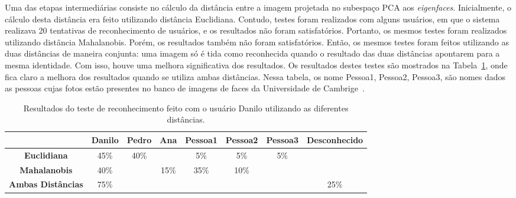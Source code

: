 

		Uma das etapas intermediárias consiste no cálculo da distância entre a imagem projetada no subespaço PCA aos \textit{eigenfaces}. Inicialmente, o cálculo desta distância era feito utilizando distância Euclidiana. Contudo, testes foram realizados com alguns usuários, em que o sistema realizava 20 tentativas de reconhecimento de usuários, e os resultados não foram satisfatórios. Portanto, os mesmos testes foram realizados utilizando distância Mahalanobis. Porém, os resultados também não foram satisfatórios. Então, os mesmos testes foram feitos utilizando as duas distâncias de maneira conjunta: uma imagem só é tida como reconhecida quando o resultado das duas distâncias apontarem para a mesma identidade. Com isso, houve uma melhora significativa dos resultados. Os resultados destes testes são mostrados na Tabela~\ref{tab:distancias}, onde fica claro a melhora dos resultados quando se utiliza ambas distâncias. Nessa tabela, os nome Pessoa1, Pessoa2, Pessoa3, são nomes dados as pessoas cujas fotos estão presentes no banco de imagens de faces da Universidade de Cambrige~\cite{cambridgeFaceDb}.

		\begin{table}[H]
		\begin{center}
			\caption{Resultados do teste de reconhecimento feito com o usuário Danilo utilizando as diferentes distâncias.}
			\label{tab:distancias}
			\begin{tabular}{|c|c|c|c|c|c|c|c|}
				\hline & \bf Danilo & \bf Pedro & \bf Ana & \bf Pessoa1 & \bf Pessoa2 & \bf Pessoa3 & \bf Desconhecido\\
				\hline \bf Euclidiana & 45\% & 40\% & & 5\% & 5\% & 5\% &\\
				\hline \bf Mahalanobis & 40\% & & 15\% & 35\% & 10\% & &\\
				\hline \bf Ambas Distâncias & 75\% & & & & & & 25\%\\
				\hline
			\end{tabular}
		\end{center}
	\end{table}

